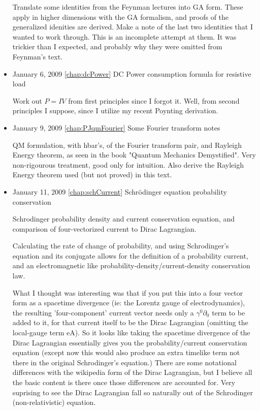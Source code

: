 \begin{itemize}
 Translate some identities from the Feynman lectures into GA form.  These apply in higher dimensions with the GA formalism, and proofs of the generalized idenities are derived.  Make a note of the last two identities that I wanted to work through.  This is an incomplete attempt at them.  It was trickier than I expected, and probably why they were omitted from Feynman's text. \item January 6, 2009 \ref{chap:dcPower} DC Power consumption formula for resistive load

Work out $P = I V$ from first principles since I forgot it.  Well, from second principles I suppose, since I utilize my recent Poynting derivation. \item January 9, 2009 \ref{chap:PJqmFourier} Some Fourier transform notes

QM formulation, with hbar's, of the Fourier transform pair, and Rayleigh Energy theorem, as seen in the book "Quantum Mechanics Demystified".  Very non-rigourous treatment, good only for intuition.  Also derive the Rayleigh Energy theorem used (but not proved) in this text. \item January 11, 2009 \ref{chap:schCurrent} Schr\"{o}dinger equation probability conservation

Schrodinger probability density and current conservation equation, and comparison of four-vectorized current to Dirac Lagrangian.

Calculating the rate of change of probability, and using Schrodinger's equation and its conjugate allows for the definition of a probability current, and an electromagnetic like probability-density/current-density conservation law. 

What I thought was interesting was that if you put this into a four vector form as a spacetime divergence (ie: the Lorentz gauge of electrodynamics), the resulting 'four-component' current vector needs only a $\gamma^0 \partial_0$ term to be added to it, for that current itself to be the Dirac Lagrangian (omitting the local-gauge term eA).  So it looks like taking the spacetime divergence of the Dirac Lagrangian essentially gives you the probability/current conservation equation (except now this would also produce an extra timelike term not there in the original Schrodinger's equation.)  There are some notational differences with the wikipedia form of the Dirac Lagrangian, but I believe all the basic content is there once those differences are accounted for.  Very suprising to see the Dirac Lagrangian fall so naturally out of the Schrodinger (non-relativistic) equation. 


\end{itemize}
